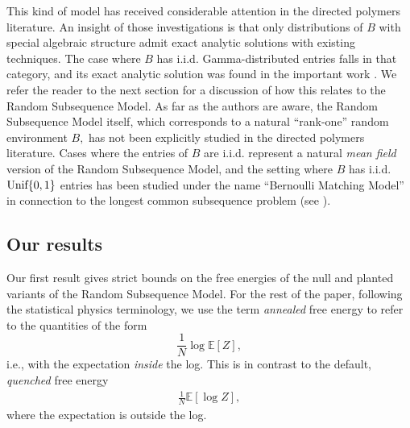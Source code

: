 \documentclass[11pt]{amsart}
\numberwithin{equation}{section}
\numberwithin{equation}{section}
\newcommand{\1}{\mathbbm{1}}
\newcommand{\E}{\mathbb{E}}
\newcommand{\Unif}{\textup{Unif}}
\theoremstyle{definition}
\begin{document}
This kind of model has received considerable attention in the directed polymers literature. An insight of those investigations is that only distributions of $B$ with special algebraic structure admit exact analytic solutions with existing techniques. The case where $B$ has i.i.d. Gamma-distributed entries falls in that category, and its exact analytic solution was found in the important work \cite{corwin2015strict}. We refer the reader to the next section for a discussion of how this relates to the Random Subsequence Model. As far as the authors are aware, the Random Subsequence Model itself, which corresponds to a natural ``rank-one'' random environment $B,$ has not been explicitly studied in the directed polymers literature. Cases where the entries of $B$ are i.i.d. represent a natural \emph{mean field} version of the Random Subsequence Model, and the setting where $B$ has i.i.d. $\Unif\{0,1\}$ entries has been studied under the name ``Bernoulli Matching Model'' in connection to the longest common subsequence problem (see \cite{boutetdemonvel1999extensive, majumdar2005exact}).

\subsection{Our results} \label{subsec:main_result}

Our first result gives strict bounds on the free energies of the null and planted variants of the Random Subsequence Model. For the rest of the paper, following the statistical physics terminology, we use the term \emph{annealed} free energy to refer to the quantities of the form
\[
\frac{1}{N}\log \E[Z],
\]
i.e., with the expectation \emph{inside} the log. This is in contrast to the default, \emph{quenched} free energy 
\begin{align*}
    \frac{1}{N}\E[\log Z],
\end{align*}
where the expectation is outside the log.
\end{document}
